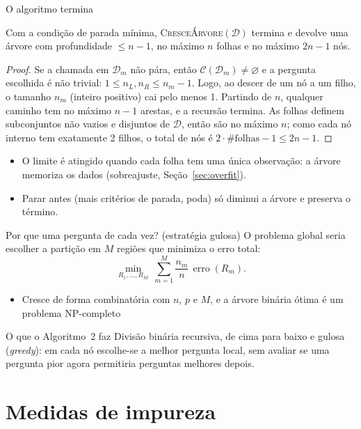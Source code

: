 \documentclass[aspectratio=169]{beamer}
\newcommand{\Cand}{\mathcal C}            %
\newcommand{\aGrow}{2}
\begin{document}
\begin{frame}{O algoritmo termina}
\begin{theorem}
Com a condição de parada mínima, \textsc{CresceÁrvore}$(\mathcal D)$ termina e devolve uma árvore com profundidade $\le n-1$, no máximo $n$ folhas e no máximo $2n-1$ nós.
\end{theorem}
\begin{proof}
Se a chamada em $\mathcal D_m$ não pára, então $\Cand(\mathcal D_m)\ne\varnothing$ e a pergunta escolhida é não trivial: $1\le n_L,n_R\le n_m-1$. Logo, ao descer de um nó a um filho, o tamanho $n_m$ (inteiro positivo) cai pelo menos 1. Partindo de $n$, qualquer caminho tem no máximo $n-1$ arestas, e a recursão termina. As folhas definem subconjuntos \alert{não vazios e disjuntos} de $\mathcal D$, então são no máximo $n$; como cada nó interno tem exatamente 2 filhos, o total de nós é $2\cdot\#\text{folhas}-1\le2n-1$.
\end{proof}
\begin{itemize}
  \item O limite é atingido quando cada folha tem uma única observação: a árvore memoriza os dados (sobreajuste, Seção~\ref{sec:overfit}).
  \item Parar \alert{antes} (mais critérios de parada, poda) só diminui a árvore e preserva o término.
\end{itemize}
\end{frame}

\begin{frame}{Por que uma pergunta de cada vez? (estratégia gulosa)}
O problema global seria escolher a partição em $M$ regiões que minimiza o erro total:
\[
\min_{R_1,\dots,R_M}\ \sum_{m=1}^M \frac{n_m}{n}\,\operatorname{erro}(R_m) .
\]
\begin{itemize}
  \item Cresce de forma combinatória com $n$, $p$ e $M$, e a árvore binária \alert{ótima} é um problema NP-completo
\end{itemize}
\begin{block}{O que o Algoritmo~\aGrow{} faz}
Divisão binária \alert{recursiva}, \alert{de cima para baixo} e \alert{gulosa} (\emph{greedy}): em cada nó escolhe-se a melhor pergunta \alert{local}, sem avaliar se uma pergunta pior agora permitiria perguntas melhores depois.
\end{block}
\end{frame}

\section{Medidas de impureza}\label{sec:impureza}
\end{document}
